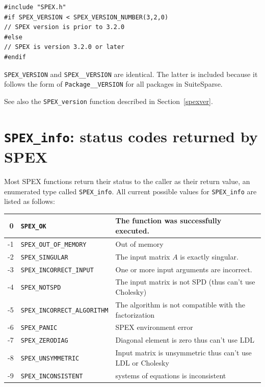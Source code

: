 \documentclass[12pt,oneside]{book}
\theoremstyle{definition}
\newenvironment{SizedCenteredTabular}[2][\small]
    {   
        #1\begin{center}\begin{tabular}{#2}
    }{ 
        \end{tabular}\end{center}
    }
\begin{document}
\begin{verbatim}
#include "SPEX.h"
#if SPEX_VERSION < SPEX_VERSION_NUMBER(3,2,0)
// SPEX version is prior to 3.2.0
#else
// SPEX is version 3.2.0 or later
#endif
\end{verbatim}

\verb'SPEX_VERSION' and \verb'SPEX__VERSION' are identical.  The latter is included
because it follows the form of \verb'Package__VERSION' for all packages in SuiteSparse.

See also the \verb'SPEX_version' function described in Section~\ref{spexver}.

\section{\texttt{SPEX\_info}: status codes returned by SPEX} \label{ss:SPEX_info}
Most SPEX functions return their status to the caller as their return value,
an enumerated type called \verb|SPEX_info|. All current possible values for
\verb|SPEX_info| are listed as follows:

\begin{SizedCenteredTabular}{rll} \hline
     0 & \verb|SPEX_OK|& The function was successfully executed.\\ \hline
    -1 & \verb|SPEX_OUT_OF_MEMORY|& Out of memory\\ \hline
    -2 & \verb|SPEX_SINGULAR|& The input matrix $A$ is exactly singular.\\ \hline
    -3 & \verb|SPEX_INCORRECT_INPUT|& One or more input arguments are incorrect.\\ \hline
    -4 & \verb|SPEX_NOTSPD| & The input matrix is not SPD (thus can't use Cholesky) \\ \hline
    -5 & \verb|SPEX_INCORRECT_ALGORITHM| & The algorithm is not compatible with the factorization \\ \hline
    -6 & \verb|SPEX_PANIC| & SPEX environment error \\ \hline
    -7 & \verb|SPEX_ZERODIAG| & Diagonal element is zero thus can't use LDL \\ \hline
    -8 & \verb|SPEX_UNSYMMETRIC| & Input matrix is unsymmetric thus can't use LDL or Cholesky  \\ \hline
    -9 & \verb|SPEX_INCONSISTENT| & systems of equations is inconsistent \\ \hline
\end{SizedCenteredTabular}
\end{document}
